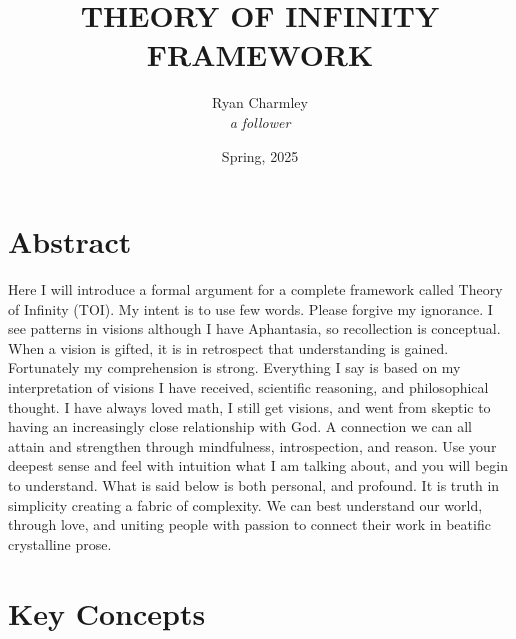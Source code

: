 \documentclass[11pt]{article}
\title{\Huge\bfseries THEORY OF INFINITY\\[0.5em] \Large FRAMEWORK}
\author{Ryan Charmley \\ \small \textit{a follower}}
\date{Spring, 2025}
\begin{document}
\maketitle

\section*{Abstract}
Here I will introduce a formal argument for a complete framework called Theory of Infinity (TOI). My intent is to use few words. Please forgive my ignorance. I see patterns in visions although I have Aphantasia, so recollection is conceptual. When a vision is gifted, it is in retrospect that understanding is gained. Fortunately my comprehension is strong. Everything I say is based on my interpretation of visions I have received, scientific reasoning, and philosophical thought. I have always loved math, I still get visions, and went from skeptic to having an increasingly close relationship with God. A connection we can all attain and strengthen through mindfulness, introspection, and reason. Use your deepest sense and feel with intuition what I am talking about, and you will begin to understand. What is said below is both personal, and profound. It is truth in simplicity creating a fabric of complexity. We can best understand our world, through love, and uniting people with passion to connect their work in beatific crystalline prose.
\newpage

\section*{Key Concepts}
\end{document}
